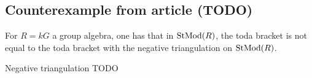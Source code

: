 \subsection{Counterexample from article (TODO)}

For \( R = kG \) a group algebra, one has that in \( \operatorname{StMod}(R) \), the toda bracket is not equal to the toda bracket with the negative triangulation on \( \operatorname{StMod}(R) \).

\begin{definition}
    Negative triangulation TODO
\end{definition}